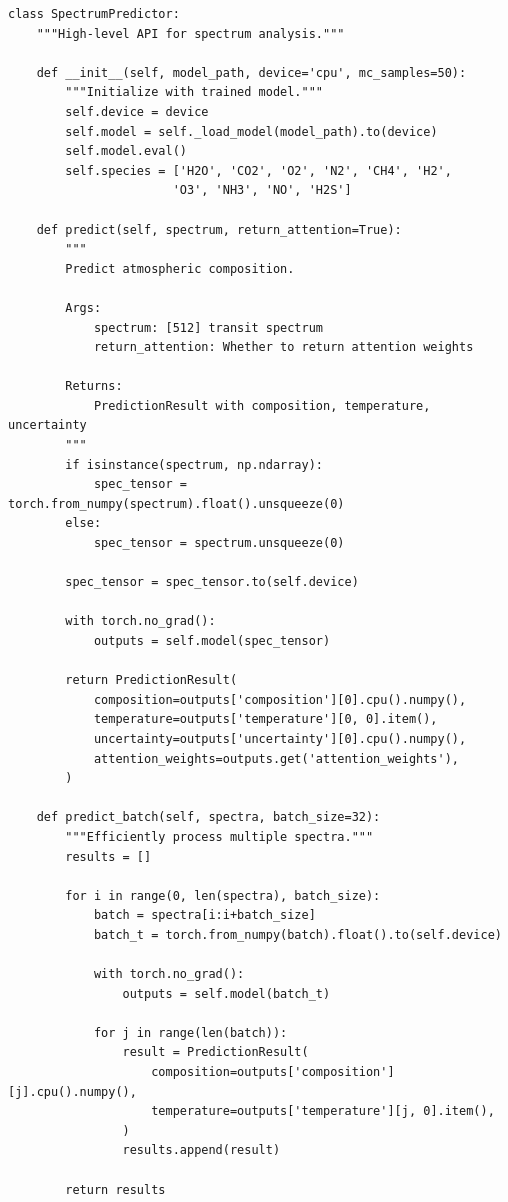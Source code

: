 \documentclass[12pt,a4paper,oneside]{report}
\begin{document}
\begin{lstlisting}
class SpectrumPredictor:
    """High-level API for spectrum analysis."""

    def __init__(self, model_path, device='cpu', mc_samples=50):
        """Initialize with trained model."""
        self.device = device
        self.model = self._load_model(model_path).to(device)
        self.model.eval()
        self.species = ['H2O', 'CO2', 'O2', 'N2', 'CH4', 'H2',
                       'O3', 'NH3', 'NO', 'H2S']

    def predict(self, spectrum, return_attention=True):
        """
        Predict atmospheric composition.

        Args:
            spectrum: [512] transit spectrum
            return_attention: Whether to return attention weights

        Returns:
            PredictionResult with composition, temperature, uncertainty
        """
        if isinstance(spectrum, np.ndarray):
            spec_tensor = torch.from_numpy(spectrum).float().unsqueeze(0)
        else:
            spec_tensor = spectrum.unsqueeze(0)

        spec_tensor = spec_tensor.to(self.device)

        with torch.no_grad():
            outputs = self.model(spec_tensor)

        return PredictionResult(
            composition=outputs['composition'][0].cpu().numpy(),
            temperature=outputs['temperature'][0, 0].item(),
            uncertainty=outputs['uncertainty'][0].cpu().numpy(),
            attention_weights=outputs.get('attention_weights'),
        )

    def predict_batch(self, spectra, batch_size=32):
        """Efficiently process multiple spectra."""
        results = []

        for i in range(0, len(spectra), batch_size):
            batch = spectra[i:i+batch_size]
            batch_t = torch.from_numpy(batch).float().to(self.device)

            with torch.no_grad():
                outputs = self.model(batch_t)

            for j in range(len(batch)):
                result = PredictionResult(
                    composition=outputs['composition'][j].cpu().numpy(),
                    temperature=outputs['temperature'][j, 0].item(),
                )
                results.append(result)

        return results


\end{lstlisting}
\end{document}
